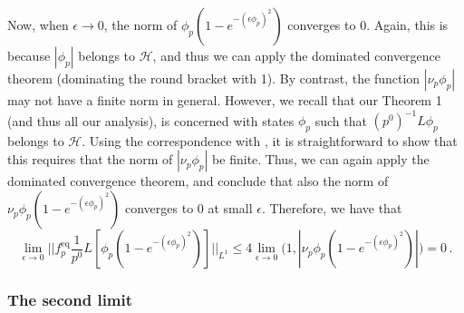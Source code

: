 \documentclass[a4paper, amsfonts, amssymb, amsmath, reprint, showkeys, nofootinbib, twoside, onecolumn,notitlepage,,longbibliography]{revtex4-2}
\theoremstyle{definition}
\theoremstyle{theorem}
\theoremstyle{corollary}
\begin{document}
Now, when $\epsilon \rightarrow 0$, the norm of $\phi_p(1- e^{-(\epsilon\phi_p)^2})$ converges to 0. Again, this is because $|\phi_p|$ belongs to $\mathcal{H}$, and thus we can apply the dominated convergence theorem (dominating the round bracket with 1). By contrast, the function $|\nu_p \phi_p|$ may not have a finite norm in general. However, we recall that our Theorem 1 (and thus all our analysis), is concerned with states $\phi_p$ such that $(p^0)^{-1}L\phi_p$ belongs to $\mathcal{H}$. Using the correspondence with \cite{Dudynski1988}, it is straightforward to show that this requires that the norm of $|\nu_p\phi_p|$ be finite. Thus, we can again apply the dominated convergence theorem, and conclude that also the norm of $\nu_p \phi_p(1- e^{-(\epsilon\phi_p)^2})$ converges to 0 at small $\epsilon$. Therefore, we have that
\begin{equation}\label{rngomk}
\lim_{\epsilon \rightarrow 0} \bigg|\bigg| f_p^\text{eq} \dfrac{1}{p^0}L [\phi_p(1- e^{-(\epsilon\phi_p)^2})] \bigg| \bigg|_{L^1} \leq 4 \lim_{\epsilon \rightarrow 0} \bigg(1,|\nu_p\phi_p(1-e^{-(\epsilon\phi_p)^2})| \bigg) =0 \, .
\end{equation}

\subsubsection{The second limit}
\end{document}
